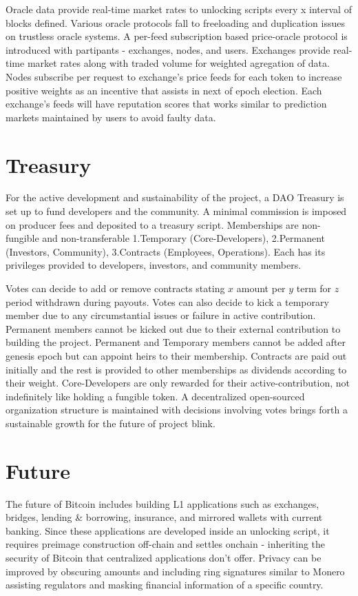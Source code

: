 \documentclass[a4paper,10pt]{article}
\begin{document}
Oracle data provide real-time market rates to unlocking scripts every x interval of blocks defined. Various oracle protocols fall to freeloading and duplication issues on trustless oracle systems. A per-feed subscription based price-oracle protocol is introduced with partipants - exchanges, nodes, and users. Exchanges provide real-time market rates along with traded volume for weighted agregation of data. Nodes subscribe per request to exchange's price feeds for each token to increase positive weights as an incentive that assists in next of epoch election. Each exchange's feeds will have reputation scores that works similar to prediction markets maintained by users to avoid faulty data.

\section{Treasury}
For the active development and sustainability of the project, a DAO Treasury is set up to fund developers and the community. A minimal commission is imposed on producer fees and deposited to a treasury script. Memberships are non-fungible and non-transferable 1.Temporary (Core-Developers), 2.Permanent (Investors, Community), 3.Contracts (Employees, Operations). Each has its privileges provided to developers, investors, and community members. 

Votes can decide to add or remove contracts stating $x$ amount per $y$ term for $z$ period withdrawn during payouts. Votes can also decide to kick a temporary member due to any circumstantial issues or failure in active contribution. Permanent members cannot be kicked out due to their external contribution to building the project. Permanent and Temporary members cannot be added after genesis epoch but can appoint heirs to their membership. Contracts are paid out initially and the rest is provided to other memberships as dividends according to their weight. Core-Developers are only rewarded for their active-contribution, not indefinitely like holding a fungible token. A decentralized open-sourced organization structure is maintained with decisions involving votes brings forth a sustainable growth for the future of project blink. 
\section{Future}

The future of Bitcoin includes building L1 applications such as exchanges, bridges, lending \& borrowing, insurance, and mirrored wallets with current banking. Since these applications are developed inside an unlocking script, it requires preimage construction off-chain and settles onchain - inheriting the security of Bitcoin that centralized applications don't offer. Privacy can be improved by obscuring amounts and including ring signatures similar to Monero assisting regulators and masking financial information of a specific country. 
\end{document}
